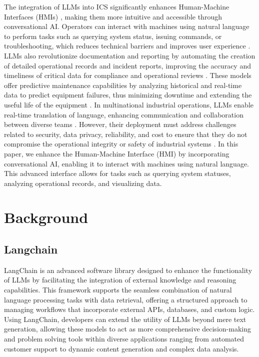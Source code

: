 \documentclass[conference]{IEEEtran}
\begin{document}
The integration of LLMs into ICS significantly enhances Human-Machine Interfaces (HMIs) \cite{kiangala2024experimental}, making them more intuitive and accessible through conversational AI. Operators can interact with machines using natural language to perform tasks such as querying system status, issuing commands, or troubleshooting, which reduces technical barriers and improves user experience \cite{kernan2024knowledge}. LLMs also revolutionize documentation and reporting by automating the creation of detailed operational records and incident reports, improving the accuracy and timeliness of critical data for compliance and operational reviews \cite{hays2024employing}. These models offer predictive maintenance capabilities by analyzing historical and real-time data to predict equipment failures, thus minimizing downtime and extending the useful life of the equipment \cite{myohanen2023improving}. In multinational industrial operations, LLMs enable real-time translation of language, enhancing communication and collaboration between diverse teams \cite{mangaonkar2024enhancing}. However, their deployment must address challenges related to security, data privacy, reliability, and cost to ensure that they do not compromise the operational integrity or safety of industrial systems \cite{yao2024survey}. In this paper, we enhance the Human-Machine Interface (HMI) by incorporating conversational AI, enabling it to interact with machines using natural language. This advanced interface allows for tasks such as querying system statuses, analyzing operational records, and visualizing data. 

\section{Background}
\label{sec:background}


\subsection{Langchain}

LangChain \cite{langchainai2023github} is an advanced software library designed to enhance the functionality of LLMs by facilitating the integration of external knowledge and reasoning capabilities. This framework supports the seamless combination of natural language processing tasks with data retrieval, offering a structured approach to managing workflows that incorporate external APIs, databases, and custom logic. Using LangChain, developers can extend the utility of LLMs beyond mere text generation, allowing these models to act as more comprehensive decision-making and problem solving tools within diverse applications ranging from automated customer support to dynamic content generation and complex data analysis.
\end{document}

